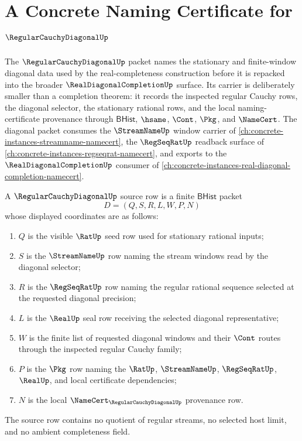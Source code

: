 \chapter{A Concrete Naming Certificate for $\RegularCauchyDiagonalUp$}
\label{ch:concrete-instances-regularcauchydiagonal-namecert}

The $\RegularCauchyDiagonalUp$ packet names the stationary and finite-window diagonal data used by the real-completeness construction before it is repacked into the broader $\RealDiagonalCompletionUp$ surface. Its carrier is deliberately smaller than a completion theorem: it records the inspected regular Cauchy rows, the diagonal selector, the stationary rational rows, and the local naming-certificate provenance through $\mathsf{BHist}$, $\hsame$, $\Cont$, $\Pkg$, and $\NameCert$. The diagonal packet consumes the $\StreamNameUp$ window carrier of \autoref{ch:concrete-instances-streamname-namecert}, the $\RegSeqRatUp$ readback surface of \autoref{ch:concrete-instances-regseqrat-namecert}, and exports to the $\RealDiagonalCompletionUp$ consumer of \autoref{ch:concrete-instances-real-diagonal-completion-namecert}.

\begin{definition}
\label{def:regular-cauchy-diagonal-source}
A $\RegularCauchyDiagonalUp$ source row is a finite $\mathsf{BHist}$ packet
$$
D=(Q,S,R,L,W,P,N)
$$
whose displayed coordinates are as follows:
\begin{enumerate}
\item $Q$ is the visible $\RatUp$ seed row used for stationary rational inputs;
\item $S$ is the $\StreamNameUp$ row naming the stream windows read by the diagonal selector;
\item $R$ is the $\RegSeqRatUp$ row naming the regular rational sequence selected at the requested diagonal precision;
\item $L$ is the $\RealUp$ seal row receiving the selected diagonal representative;
\item $W$ is the finite list of requested diagonal windows and their $\Cont$ routes through the inspected regular Cauchy family;
\item $P$ is the $\Pkg$ row naming the $\RatUp$, $\StreamNameUp$, $\RegSeqRatUp$, $\RealUp$, and local certificate dependencies;
\item $N$ is the local $\NameCert_{\RegularCauchyDiagonalUp}$ provenance row.
\end{enumerate}
The source row contains no quotient of regular streams, no selected host limit, and no ambient completeness field.
\end{definition}

